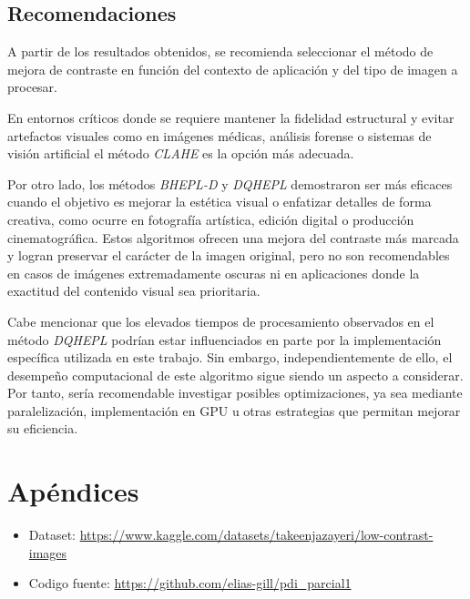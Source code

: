 \documentclass[sigchi]{acmart}
\begin{document}
\subsection{Recomendaciones}
\label{subsec:recomendaciones}

A partir de los resultados obtenidos, se recomienda seleccionar el método de mejora de
contraste en función del contexto de aplicación y del tipo de imagen a procesar.

En entornos críticos donde se requiere mantener la fidelidad estructural y evitar artefactos
visuales como en imágenes médicas, análisis forense o sistemas de visión artificial el método
\emph{CLAHE} es la opción más adecuada. 

Por otro lado, los métodos \emph{BHEPL-D} y \emph{DQHEPL} demostraron ser más eficaces cuando
el objetivo es mejorar la estética visual o enfatizar detalles de forma creativa, como ocurre
en fotografía artística, edición digital o producción cinematográfica. Estos algoritmos ofrecen
una mejora del contraste más marcada y logran preservar el carácter de la imagen original, pero
no son recomendables en casos de imágenes extremadamente oscuras ni en aplicaciones donde la
exactitud del contenido visual sea prioritaria.

Cabe mencionar que los elevados tiempos de procesamiento observados en el método \emph{DQHEPL}
podrían estar influenciados en parte por la implementación específica utilizada en este
trabajo. Sin embargo, independientemente de ello, el desempeño computacional de este algoritmo
sigue siendo un aspecto a considerar. Por tanto, sería recomendable investigar posibles
optimizaciones, ya sea mediante paralelización, implementación en GPU u otras estrategias que
permitan mejorar su eficiencia.

\newpage

\section{Apéndices}
\label{sec:apendices}

\begin{itemize}
	\item Dataset: \url{https://www.kaggle.com/datasets/takeenjazayeri/low-contrast-images}
	\item Codigo fuente: \url{https://github.com/elias-gill/pdi_parcial1}
\end{itemize}

\nocite{*} %


\label{sec:bibliography}
\end{document}
